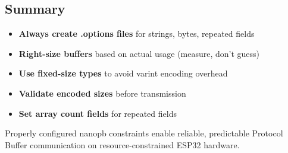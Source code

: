 \subsection{Summary}

\begin{itemize}
\item \textbf{Always create .options files} for strings, bytes, repeated fields
\item \textbf{Right-size buffers} based on actual usage (measure, don't guess)
\item \textbf{Use fixed-size types} to avoid varint encoding overhead
\item \textbf{Validate encoded sizes} before transmission
\item \textbf{Set array count fields} for repeated fields
\end{itemize}

Properly configured nanopb constraints enable reliable, predictable Protocol Buffer communication on resource-constrained ESP32 hardware.
